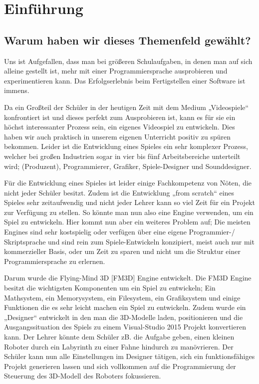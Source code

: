 
\chapter{Einführung}
\label{c:einführung}
\setcounter{page}{1}
\section[Warum dieses Themenfeld?]{Warum haben wir dieses Themenfeld gewählt?}

Uns ist Aufgefallen, dass man bei größeren Schulaufgaben, in denen man auf sich alleine gestellt ist, mehr mit einer Programmiersprache ausprobieren und experimentieren kann. Das Erfolgserlebnis beim Fertigstellen einer Software ist immens. 

Da ein Großteil der Schüler in der heutigen Zeit mit dem Medium „Videospiele“ konfrontiert ist und dieses perfekt zum Ausprobieren ist, kann es für sie ein höchst interessanter Prozess sein, ein eigenes Videospiel zu entwickeln. Dies haben wir auch praktisch in unserem eigenen Unterricht positiv zu spüren bekommen.
Leider ist die Entwicklung eines Spieles ein sehr komplexer Prozess, welcher bei großen Industrien sogar in vier bis fünf Arbeitsbereiche unterteilt wird; (Produzent), Programmierer, Grafiker, Spiele-Designer und Sounddesigner.  \cite{gea}

Für die Entwicklung eines Spieles ist leider einige Fachkompetenz von Nöten, die nicht jeder Schüler besitzt. Zudem ist die Entwicklung „from scratch“ eines Spieles sehr zeitaufwendig und nicht jeder Lehrer kann so viel Zeit für ein Projekt zur Verfügung zu stellen. 
So könnte man nun also eine Engine verwenden, um ein Spiel zu entwickeln. Hier kommt nun aber ein weiteres Problem auf; Die meisten Engines sind sehr kostspielig oder verfügen über eine eigene Programmier-/ Skriptsprache und sind rein zum Spiele-Entwickeln konzipiert, meist auch nur mit kommerzieller Basis, oder um Zeit zu sparen und nicht um die Struktur einer Programmiersprache zu erlernen.

Darum wurde die Flying-Mind 3D [FM3D] Engine entwickelt. Die FM3D Engine besitzt die wichtigsten Komponenten um ein Spiel zu entwickeln;  Ein Mathsystem, ein Memorysystem, ein Filesystem, ein Grafiksystem und einige Funktionen die es sehr leicht machen ein Spiel zu entwickeln.
Zudem wurde ein „Designer“ entwickelt in den man die 3D-Modelle laden, positionieren und die Ausgangssituation des Spiels zu einem Visual-Studio 2015 Projekt konvertieren kann.
Der Lehrer könnte dem Schüler zB. die Aufgabe geben, einen kleinen Roboter durch ein Labyrinth zu einer Fahne hindurch zu manövrieren. Der Schüler kann nun alle Einstellungen im Designer tätigen, sich ein funktionsfähiges Projekt generieren lassen und sich vollkommen auf die Programmierung der Steuerung des 3D-Modell des Roboters fokussieren.

